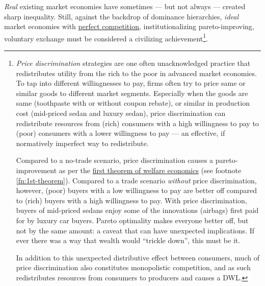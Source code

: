 \emph{Real} existing market economies have sometimes --- but not always --- created sharp inequality. Still, against the backdrop of dominance hierarchies, \emph{ideal} market economies with \hyperref[fn:perfect-competition]{perfect competition}, institutionalizing pareto-improving, voluntary exchange must be considered a civilizing achievement\footnote{
	\emph{Price discrimination} strategies are one often unacknowledged practice that redistributes utility from the rich to the poor in advanced market economies. To tap into different willingnesses to pay, firms often try to price same or similar goods to different market segments. Especially when the goods are same (toothpaste with or without coupon rebate), or similar in production cost (mid-priced sedan and luxury sedan), price discrimination can redistribute resources from (rich) consumers with a high willingness to pay to (poor) consumers with a lower willingness to pay --- an effective, if normatively imperfect way to redistribute.
	
	Compared to a no-trade scenario, price discrimination causes a pareto-improvement as per the \hyperref[fn:1st-theorem]{first theorem of welfare economics} (see footnote \ref{fn:1st-theorem}). Compared to a trade scenario \emph{without} price discrimination, however, (poor) buyers with a low willingness to pay are better off compared to (rich) buyers with a high willingness to pay. With price discrimination, buyers of mid-priced sedans enjoy some of the innovations (airbags) first paid for by luxury car buyers. Pareto optimality makes everyone better off, but not by the same amount: a caveat that can have unexpected implications. If ever there was a way that wealth would ``trickle down'', this must be it.
	
	In addition to this unexpected distributive effect between consumers, much of price discrimination also constitutes monopolistic competition, and as such redistributes resources from consumers to producers and causes a \gls{DWL}.}.%


